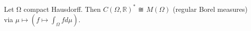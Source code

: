 Let Ω compact Hausdorff. Then $C(\Omega,\mathbb{R})^*$ ≅ $M(\Omega)$ (regular Borel measures) via $\mu\mapsto(f\mapsto\int_\Omega f d\mu)$.
